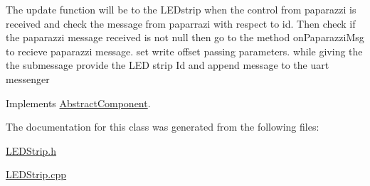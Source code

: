 The update function will be to the L\+E\+Dstrip when the control from paparazzi is received and check the message from paparrazi with respect to id. Then check if the paparazzi message received is not null then go to the method on\+Paparazzi\+Msg to recieve paparazzi message. set write offset passing parameters. while giving the the submessage provide the L\+ED strip Id and append message to the uart messenger 

Implements \hyperlink{class_abstract_component_af25a90b8ab213762221c3b358d9873f3}{Abstract\+Component}.



The documentation for this class was generated from the following files\+:\begin{DoxyCompactItemize}
\item 
\hyperlink{_l_e_d_strip_8h}{L\+E\+D\+Strip.\+h}\item 
\hyperlink{_l_e_d_strip_8cpp}{L\+E\+D\+Strip.\+cpp}\end{DoxyCompactItemize}
